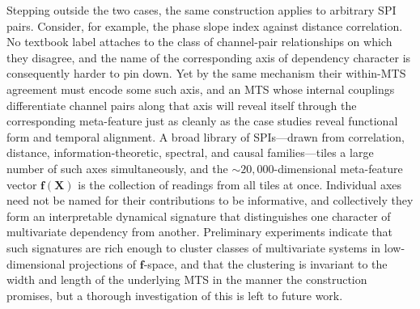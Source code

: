 \documentclass{article}
\theoremstyle{plain}
\theoremstyle{definition}
\theoremstyle{remark}
\begin{document}
Stepping outside the two cases, the same construction applies to arbitrary SPI pairs. Consider, for example, the phase slope index against distance correlation. No textbook label attaches to the class of channel-pair relationships on which they disagree, and the name of the corresponding axis of dependency character is consequently harder to pin down. Yet by the same mechanism their within-MTS agreement must encode some such axis, and an MTS whose internal couplings differentiate channel pairs along that axis will reveal itself through the corresponding meta-feature just as cleanly as the case studies reveal functional form and temporal alignment. A broad library of SPIs---drawn from correlation, distance, information-theoretic, spectral, and causal families---tiles a large number of such axes simultaneously, and the $\sim\!20{,}000$-dimensional meta-feature vector $\mathbf{f}(\mathbf{X})$ is the collection of readings from all tiles at once. Individual axes need not be named for their contributions to be informative, and collectively they form an interpretable dynamical signature that distinguishes one character of multivariate dependency from another. Preliminary experiments indicate that such signatures are rich enough to cluster classes of multivariate systems in low-dimensional projections of $\mathbf{f}$-space, and that the clustering is invariant to the width and length of the underlying MTS in the manner the construction promises, but a thorough investigation of this is left to future work.




\newpage
\appendix
\onecolumn
\section{}
\end{document}
